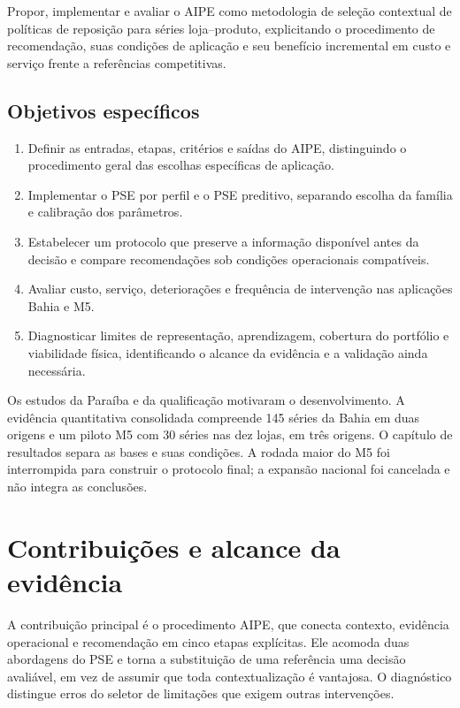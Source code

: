 Propor, implementar e avaliar o AIPE como metodologia de seleção contextual de políticas de reposição para séries loja--produto, explicitando o procedimento de recomendação, suas condições de aplicação e seu benefício incremental em custo e serviço frente a referências competitivas.

\subsection*{Objetivos específicos}

\begin{enumerate}
  \item Definir as entradas, etapas, critérios e saídas do AIPE, distinguindo o procedimento geral das escolhas específicas de aplicação.
  \item Implementar o PSE por perfil e o PSE preditivo, separando escolha da família e calibração dos parâmetros.
  \item Estabelecer um protocolo que preserve a informação disponível antes da decisão e compare recomendações sob condições operacionais compatíveis.
  \item Avaliar custo, serviço, deteriorações e frequência de intervenção nas aplicações Bahia e M5.
  \item Diagnosticar limites de representação, aprendizagem, cobertura do portfólio e viabilidade física, identificando o alcance da evidência e a validação ainda necessária.
\end{enumerate}

Os estudos da Paraíba e da qualificação motivaram o desenvolvimento. A evidência quantitativa consolidada compreende 145 séries da Bahia em duas origens e um piloto M5 com 30 séries nas dez lojas, em três origens. O capítulo de resultados separa as bases e suas condições. A rodada maior do M5 foi interrompida para construir o protocolo final; a expansão nacional foi cancelada e não integra as conclusões.

\section{Contribuições e alcance da evidência}

A contribuição principal é o procedimento AIPE, que conecta contexto, evidência operacional e recomendação em cinco etapas explícitas. Ele acomoda duas abordagens do PSE e torna a substituição de uma referência uma decisão avaliável, em vez de assumir que toda contextualização é vantajosa. O diagnóstico distingue erros do seletor de limitações que exigem outras intervenções.

